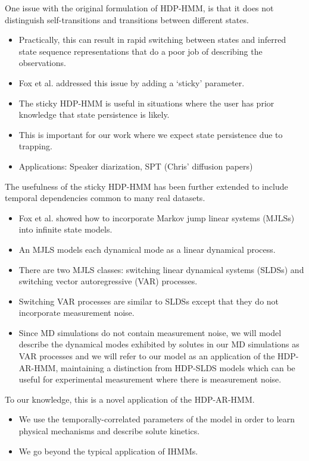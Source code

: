 \documentclass[journal=jpcbfk,manuscript=article]{achemso}
\begin{document}
  One issue with the original formulation of HDP-HMM, is that it does not 
  distinguish self-transitions and transitions between different states.
  \begin{itemize}
    \item Practically, this can result in rapid switching between states and
    inferred state sequence representations that do a poor job of describing
    the observations. 
    \item Fox et al. addressed this issue by adding a `sticky' parameter.~\cite{fox_sticky_2007}
    \item The sticky HDP-HMM is useful in situations where the user has
    prior knowledge that state persistence is likely.
    \item This is important for our work where we expect state persistence 
    due to trapping.
    \item Applications: Speaker diarization, SPT (Chris' diffusion papers)
  \end{itemize}
  
  The usefulness of the sticky HDP-HMM has been further extended to include 
  temporal dependencies common to many real datasets.
  \begin{itemize}
    \item Fox et al. showed how to incorporate Markov jump linear systems (MJLSs)
    into infinite state models.~\cite{fox_nonparameteric_2009}
    \item An MJLS models each dynamical mode as a linear dynamical process.
    \item There are two MJLS classes: switching linear dynamical systems (SLDSs) 
    and switching vector autoregressive (VAR) processes.
    \item Switching VAR processes are similar to SLDSs except that they do not
    incorporate measurement noise.
    \item Since MD simulations do not contain measurement noise, we will model
    describe the dynamical modes exhibited by solutes in our MD simulations as 
    VAR processes and we will refer to our model as an application of the 
    HDP-AR-HMM, maintaining a distinction from HDP-SLDS models which can
    be useful for experimental measurement where there is measurement noise.
  \end{itemize}
  
  To our knowledge, this is a novel application of the HDP-AR-HMM.
  \begin{itemize}
    \item We use the temporally-correlated parameters of the model in order
    to learn physical mechanisms and describe solute kinetics.
    \item We go beyond the typical application of IHMMs.
  \end{itemize}
  
\end{document}
